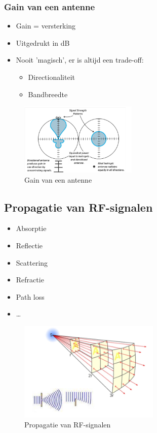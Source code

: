 \documentclass{article}
\begin{document}
\subsubsection{Gain van een antenne}
\begin{itemize}
    \item Gain = versterking
    \item Uitgedrukt in dB
    \item Nooit 'magisch', er is altijd een trade-off:
    \begin{itemize}
        \item Directionaliteit
        \item Bandbreedte
    \end{itemize}
\end{itemize}

\begin{figure}[H]
    \centering
    \includegraphics[width=0.5\textwidth]{Screenshot_20200309_122914.png}
    \caption{Gain van een antenne}
\end{figure}

\subsection{Propagatie van RF-signalen}
\begin{itemize}
    \item Absorptie
    \item Reflectie
    \item Scattering
    \item Refractie
    \item Path loss
    \item \dots
\end{itemize}

\begin{figure}[H]
    \centering
    \includegraphics[width=0.6\textwidth]{Screenshot_20200309_123000.png}
    \caption{Propagatie van RF-signalen}
\end{figure}
\end{document}
